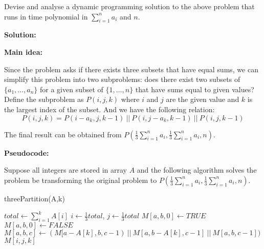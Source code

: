 \documentclass{article}
\begin{document}
Devise and analyse a dynamic programming solution to the above problem that runs in time polynomial in $\sum\limits_{i=1}^n a_i$ and $n$.
{\color{blue}
\par\textbf{Solution: }
\par\textbf{Main idea: }
\par Since the problem asks if there exists three subsets that have equal sums, we can simplify this problem into two subproblems: does there exist two subsets of $\{a_1,\ldots,a_n\}$ for a given subset of $\{1,\ldots,n\}$ that have sums equal to given values? Define the subproblem as $P(i,j,k)$ where $i$ and $j$ are the given value and $k$ is the largest index of the subset. And we have the following relation: 
\[P(i,j,k) = P(i-a_k,j,k-1)\ ||\ P(i,j-a_k,k-1)\ ||\ P(i,j,k-1)\]
\par The final result can be obtained from $P(\frac{1}{3}\sum\limits_{i=1}^{n}{a_i}, \frac{1}{3}\sum\limits_{i=1}^{n}{a_i}, n)$.\\

\par\textbf{Pseudocode: }
\par Suppose all integers are stored in array $A$ and the following algorithm solves the problem be transforming the original problem to $P(\frac{1}{3}\sum\limits_{i=1}^{n}{a_i}, \frac{1}{3}\sum\limits_{i=1}^{n}{a_i}, n)$.
\begin{algorithm}
	\caption{threePartition(A,k)}
	\label{alg2}
	\color{blue}
	\begin{algorithmic}
		\STATE $total \gets \sum\limits_{i=1}^{k}{A[i]}$
		\STATE $i \gets \frac{1}{3}total$, $j \gets \frac{1}{3}total$
					\STATE $M[a,b,0] \gets TRUE$
				\ELSE
					\STATE $M[a,b,0] \gets FALSE$
				\ENDIF
			\ENDWHILE
		\ENDWHILE
					\STATE $M[a,b,c] \gets (M[a-A[k],b,c-1)\ ||\ M[a,b-A[k],c-1]\ ||\ M[a,b,c-1])$
				\ENDWHILE
			\ENDWHILE
		\ENDWHILE
		\RETURN $M[i,j,k]$
	\end{algorithmic}
\end{algorithm}

}
\end{document}
